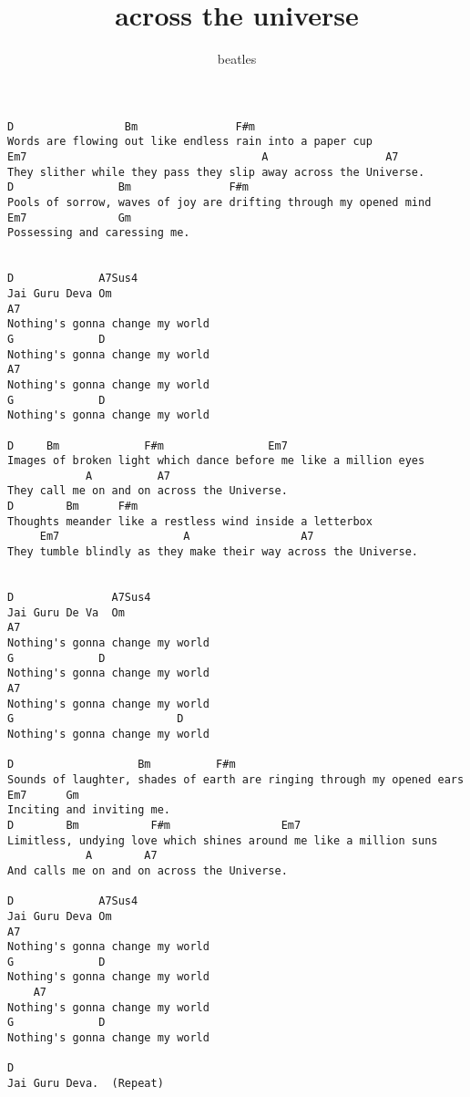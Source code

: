 \author{beatles}
\title{across the universe}
\maketitle
\begin{verbatim}
D                 Bm               F#m
Words are flowing out like endless rain into a paper cup
Em7                                    A                  A7
They slither while they pass they slip away across the Universe.
D                Bm               F#m
Pools of sorrow, waves of joy are drifting through my opened mind
Em7              Gm
Possessing and caressing me.


D             A7Sus4
Jai Guru Deva Om
A7			  
Nothing's gonna change my world
G			  D
Nothing's gonna change my world
A7			             
Nothing's gonna change my world
G			  D
Nothing's gonna change my world

D	  Bm		     F#m	   		    Em7
Images of broken light which dance before me like a million eyes
			A		   A7
They call me on and on across the Universe.
D		 Bm		 F#m
Thoughts meander like a restless wind inside a letterbox
     Em7			       A                 A7
They tumble blindly as they make their way across the Universe.
	

D               A7Sus4
Jai Guru De Va  Om
A7			 
Nothing's gonna change my world
G			  D
Nothing's gonna change my world
A7           
Nothing's gonna change my world
G                         D
Nothing's gonna change my world

D                   Bm			F#m
Sounds of laughter, shades of earth are ringing through my opened ears
Em7	     Gm
Inciting and inviting me.
D	     Bm		      F#m			      Em7
Limitless, undying love which shines around me like a million suns
			A	     A7
And calls me on and on across the Universe.

D             A7Sus4
Jai Guru Deva Om
A7
Nothing's gonna change my world
G			  D
Nothing's gonna change my world
 	A7			             
Nothing's gonna change my world
G			  D
Nothing's gonna change my world

D
Jai Guru Deva.  (Repeat)
\end{verbatim}